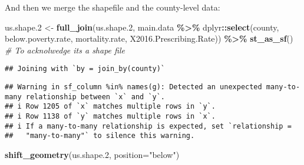 \documentclass[
]{article}
\newenvironment{Shaded}{\begin{snugshade}}{\end{snugshade}}
\newcommand{\AttributeTok}[1]{\textcolor[rgb]{0.13,0.29,0.53}{#1}}
\newcommand{\CommentTok}[1]{\textcolor[rgb]{0.56,0.35,0.01}{\textit{#1}}}
\newcommand{\FloatTok}[1]{\textcolor[rgb]{0.00,0.00,0.81}{#1}}
\newcommand{\FunctionTok}[1]{\textcolor[rgb]{0.13,0.29,0.53}{\textbf{#1}}}
\newcommand{\NormalTok}[1]{#1}
\newcommand{\OtherTok}[1]{\textcolor[rgb]{0.56,0.35,0.01}{#1}}
\newcommand{\SpecialCharTok}[1]{\textcolor[rgb]{0.81,0.36,0.00}{\textbf{#1}}}
\newcommand{\StringTok}[1]{\textcolor[rgb]{0.31,0.60,0.02}{#1}}
\begin{document}
\vspace{6mm}

And then we merge the shapefile and the county-level data:

\vspace{6mm}

\begin{Shaded}
\begin{Highlighting}[]
\NormalTok{us.shape}\FloatTok{.2} \OtherTok{\textless{}{-}} \FunctionTok{full\_join}\NormalTok{(us.shape}\FloatTok{.2}\NormalTok{,}
\NormalTok{  main.data }\SpecialCharTok{\%\textgreater{}\%}
\NormalTok{    dplyr}\SpecialCharTok{::}\FunctionTok{select}\NormalTok{(county, below.poverty.rate, mortality.rate, X2016.Prescribing.Rate)) }\SpecialCharTok{\%\textgreater{}\%}
  \FunctionTok{st\_as\_sf}\NormalTok{() }\CommentTok{\# To acknolwedge its a shape file}
\end{Highlighting}
\end{Shaded}

\begin{verbatim}
## Joining with `by = join_by(county)`
\end{verbatim}

\begin{verbatim}
## Warning in sf_column %in% names(g): Detected an unexpected many-to-many relationship between `x` and `y`.
## i Row 1205 of `x` matches multiple rows in `y`.
## i Row 1138 of `y` matches multiple rows in `x`.
## i If a many-to-many relationship is expected, set `relationship =
##   "many-to-many"` to silence this warning.
\end{verbatim}

\begin{Shaded}
\begin{Highlighting}[]
\FunctionTok{shift\_geometry}\NormalTok{(us.shape}\FloatTok{.2}\NormalTok{, }\AttributeTok{position=}\StringTok{"below"}\NormalTok{)}
\end{Highlighting}
\end{Shaded}
\end{document}
